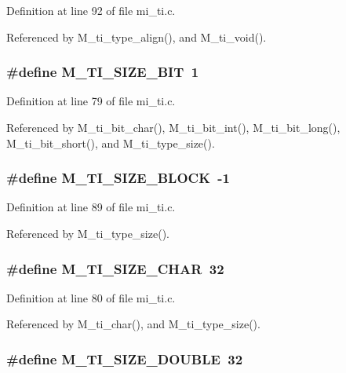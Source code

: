 Definition at line 92 of file mi\_\-ti.c.

Referenced by M\_\-ti\_\-type\_\-align(), and M\_\-ti\_\-void().
\subsubsection{\setlength{\rightskip}{0pt plus 5cm}\#define M\_\-TI\_\-SIZE\_\-BIT~1}\label{mi__ti_8c_4aa2563121f221fae307c4f0c907512a}




Definition at line 79 of file mi\_\-ti.c.

Referenced by M\_\-ti\_\-bit\_\-char(), M\_\-ti\_\-bit\_\-int(), M\_\-ti\_\-bit\_\-long(), M\_\-ti\_\-bit\_\-short(), and M\_\-ti\_\-type\_\-size().
\subsubsection{\setlength{\rightskip}{0pt plus 5cm}\#define M\_\-TI\_\-SIZE\_\-BLOCK~-1}\label{mi__ti_8c_2cc906f967840afae284c45a636f60fe}




Definition at line 89 of file mi\_\-ti.c.

Referenced by M\_\-ti\_\-type\_\-size().
\subsubsection{\setlength{\rightskip}{0pt plus 5cm}\#define M\_\-TI\_\-SIZE\_\-CHAR~32}\label{mi__ti_8c_603e55daa81040df099857c075ef5f05}




Definition at line 80 of file mi\_\-ti.c.

Referenced by M\_\-ti\_\-char(), and M\_\-ti\_\-type\_\-size().
\subsubsection{\setlength{\rightskip}{0pt plus 5cm}\#define M\_\-TI\_\-SIZE\_\-DOUBLE~32}\label{mi__ti_8c_b26027711a8ac5d3f24f8a04589c5a18}




